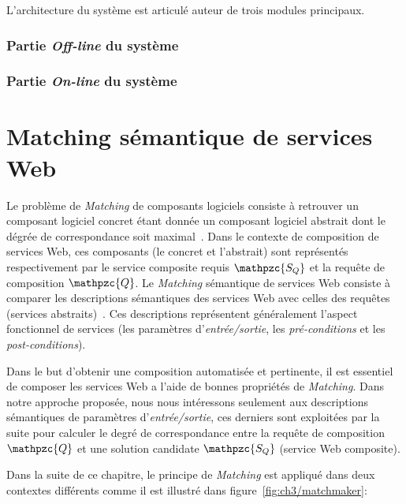 L'architecture du système est articulé auteur de trois modules
principaux.
\subsubsection{Partie \emph{Off-line} du système}
\label{sec:presentation-architecture-online}

\subsubsection{Partie \emph{On-line} du système}
\label{sec:presentation-architecture-online}

\newpage
\section{Matching sémantique de services Web}
\label{sec:ch3/matching}

Le problème de \emph{Matching} de composants logiciels consiste à
retrouver un composant logiciel concret étant donnée un composant
logiciel abstrait dont le dégrée de correspondance soit
maximal~\cite{lecue2008composition}. Dans le contexte de composition
de services Web, ces composants (le concret et l'abstrait) sont
représentés respectivement par le service composite requis {\large
  $\mathpzc{S_Q}$} et la requête de composition {\large
  $\mathpzc{Q}$}. Le \emph{Matching} sémantique de services Web
consiste à comparer les descriptions sémantiques des services Web avec
celles des requêtes (services
abstraits)~\cite{paolucci2002semantic}. Ces descriptions représentent
généralement l'aspect fonctionnel de services (les paramètres
d'\emph{entrée/sortie}, les \emph{pré-conditions} et les
\emph{post-conditions}).\medskip

Dans le but d'obtenir une composition automatisée et pertinente, il
est essentiel de composer les services Web a l'aide de bonnes
propriétés de \emph{Matching}. Dans notre approche proposée, nous nous
intéressons seulement aux descriptions sémantiques de paramètres
d'\emph{entrée/sortie}, ces derniers sont exploitées par la suite pour
calculer le degré de correspondance entre la requête de composition
{\large $\mathpzc{Q}$} et une solution candidate {\large
  $\mathpzc{S_Q}$} (service Web composite).\medskip

Dans la suite de ce chapitre, le principe de \emph{Matching} est
appliqué dans deux contextes différents comme il est illustré dans
figure~\ref{fig:ch3/matchmaker}:



